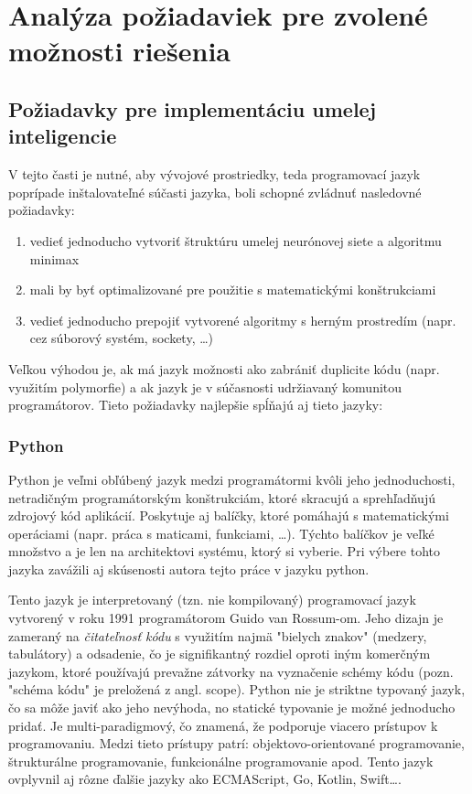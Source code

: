\section{Analýza požiadaviek pre zvolené možnosti riešenia}\label{sec:requirements}

\subsection{Požiadavky pre implementáciu umelej inteligencie}\label{subsec:requirements-ai}

V tejto časti je nutné, aby vývojové prostriedky, teda programovací jazyk poprípade inštalovateľné súčasti jazyka, boli
schopné zvládnuť nasledovné požiadavky:
\begin{enumerate}
    \item vedieť jednoducho vytvoriť štruktúru umelej neurónovej siete a algoritmu minimax
    \item mali by byť optimalizované pre použitie s matematickými konštrukciami
    \item vedieť jednoducho prepojiť vytvorené algoritmy s herným prostredím (napr. cez súborový systém, sockety, \ldots)
\end{enumerate}
Veľkou výhodou je, ak má jazyk možnosti ako zabrániť duplicite kódu (napr. využitím polymorfie) a ak jazyk je v
súčasnosti udržiavaný komunitou programátorov.
Tieto požiadavky najlepšie spĺňajú\cite{best_ai_languages} aj tieto jazyky:

\subsubsection{Python}

Python je veľmi obľúbený jazyk medzi programátormi kvôli jeho jednoduchosti, netradičným programátorským
konštrukciám, ktoré skracujú a sprehľadňujú zdrojový kód aplikácií.
Poskytuje aj balíčky, ktoré pomáhajú s matematickými operáciami (napr. práca s maticami, funkciami, \dots).
Týchto balíčkov je veľké množstvo a je len na architektovi systému, ktorý si vyberie.
Pri výbere tohto jazyka zavážili aj skúsenosti autora tejto práce v jazyku python.

Tento jazyk je interpretovaný (tzn. nie kompilovaný) programovací jazyk vytvorený v roku 1991 programátorom
Guido van Rossum-om.\cite{lang_python}
Jeho dizajn je zameraný na \emph{čitateľnosť kódu} s využitím najmä "bielych znakov" (medzery, tabulátory) a odsadenie,
čo je signifikantný rozdiel oproti iným komerčným jazykom, ktoré používajú prevažne zátvorky \shellcmd{\{\dots\}} na
vyznačenie schémy kódu (pozn. "schéma kódu" je preložená z angl. scope).
Python nie je striktne typovaný jazyk, čo sa môže javiť ako jeho nevýhoda, no statické typovanie je možné jednoducho
pridať.
Je multi-paradigmový, čo znamená, že podporuje viacero prístupov k programovaniu.
Medzi tieto prístupy patrí: objektovo-orientované programovanie, štrukturálne programovanie, funkcionálne programovanie
apod.
Tento jazyk ovplyvnil aj rôzne ďalšie jazyky ako ECMAScript, Go, Kotlin, Swift\dots.

